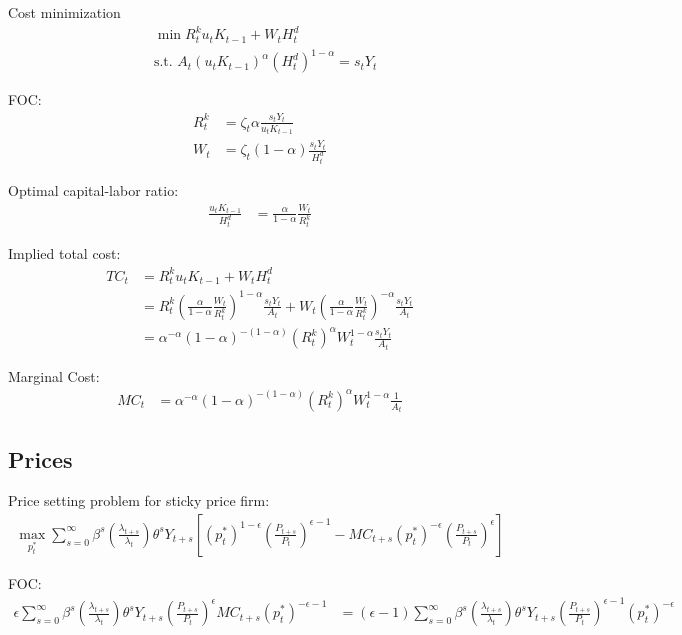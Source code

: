 \documentclass[11pt]{article}
\begin{document}
Cost minimization
\begin{align*}
	&\min R_{t}^k u_t K_{t-1} + W_t H_t^d \\
	&\text{s.t. } A_t (u_t K_{t-1})^{\alpha} (H_t^d)^{1-\alpha} = s_t Y_t
\end{align*}

FOC:
\begin{align*}
	R_{t}^k &= \zeta_t \alpha \frac{s_t Y_t}{u_t K_{t-1}} \\
	W_t &= \zeta_t (1-\alpha) \frac{s_t Y_t}{H_t^d}
\end{align*}

Optimal capital-labor ratio:
\begin{align*}
	\frac{u_t K_{t-1}}{H_t^d} &= \frac{\alpha}{1-\alpha}\frac{W_t}{R_{t}^k}
\end{align*}

Implied total cost:
\begin{align*}
	TC_t &= R_{t}^k u_t K_{t-1} + W_t H_t^d \\
	&=R_{t}^k \left(\frac{\alpha}{1-\alpha}\frac{W_t}{R_{t}^k}\right)^{1-\alpha} \frac{s_t Y_t}{A_t} + W_t \left(\frac{\alpha}{1-\alpha}\frac{W_t}{R_{t}^k}\right)^{-\alpha}\frac{s_t Y_t}{A_t} \\
	&=\alpha^{-\alpha} (1-\alpha)^{-(1-\alpha)} (R_{t}^k)^{\alpha}W_t^{1-\alpha}\frac{s_t Y_t}{A_t} 
\end{align*}

Marginal Cost:
\begin{align*}
	MC_t &=\alpha^{-\alpha} (1-\alpha)^{-(1-\alpha)} (R_{t}^k)^{\alpha}W_t^{1-\alpha}\frac{1}{A_t} 
\end{align*}

\subsection{Prices}

Price setting problem for sticky price firm:
\begin{align*}
	\max_{p_t^*} \sum_{s=0}^{\infty} \beta^s\left(\frac{\lambda_{t+s}}{\lambda_t}\right)\theta^{s}Y_{t+s}\left[(p_t^*)^{1-\epsilon} \left(\frac{P_{t+s}}{P_t}\right)^{\epsilon-1}  - MC_{t+s} (p_t^*)^{-\epsilon}\left(\frac{P_{t+s}}{P_t}\right)^{\epsilon}\right]
\end{align*}

FOC:
\begin{align*}
	\epsilon\sum_{s=0}^{\infty} \beta^s\left(\frac{\lambda_{t+s}}{\lambda_t}\right)\theta^{s} Y_{t+s} \left(\frac{P_{t+s}}{P_t}\right)^{\epsilon} MC_{t+s} (p_t^*)^{-\epsilon-1} 
	&=(\epsilon-1)\sum_{s=0}^{\infty} \beta^s\left(\frac{\lambda_{t+s}}{\lambda_t}\right)\theta^{s}Y_{t+s}\left(\frac{P_{t+s}}{P_t}\right)^{\epsilon-1}  (p_t^*)^{-\epsilon} 
\end{align*}
\end{document}
